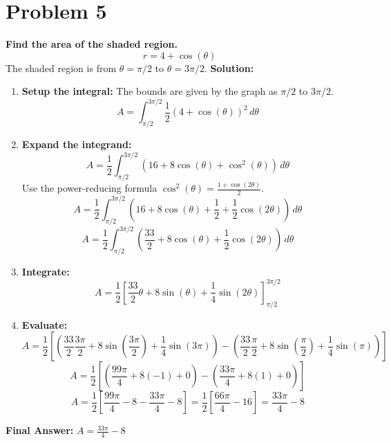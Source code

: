 \documentclass{article}
\begin{document}
\section*{Problem 5}
\textbf{Find the area of the shaded region.}
\[ r = 4 + \cos(\theta) \]
The shaded region is from $\theta = \pi/2$ to $\theta = 3\pi/2$.
\textbf{Solution:}
\begin{enumerate}
    \item \textbf{Setup the integral:} The bounds are given by the graph as $\pi/2$ to $3\pi/2$.
    \[ A = \int_{\pi/2}^{3\pi/2} \frac{1}{2} (4 + \cos(\theta))^2 \,d\theta \]
    \item \textbf{Expand the integrand:}
    \[ A = \frac{1}{2} \int_{\pi/2}^{3\pi/2} (16 + 8\cos(\theta) + \cos^2(\theta)) \,d\theta \]
    Use the power-reducing formula $\cos^2(\theta) = \frac{1 + \cos(2\theta)}{2}$.
    \[ A = \frac{1}{2} \int_{\pi/2}^{3\pi/2} \left(16 + 8\cos(\theta) + \frac{1}{2} + \frac{1}{2}\cos(2\theta)\right) \,d\theta \]
    \[ A = \frac{1}{2} \int_{\pi/2}^{3\pi/2} \left(\frac{33}{2} + 8\cos(\theta) + \frac{1}{2}\cos(2\theta)\right) \,d\theta \]
    \item \textbf{Integrate:}
    \[ A = \frac{1}{2} \left[ \frac{33}{2}\theta + 8\sin(\theta) + \frac{1}{4}\sin(2\theta) \right]_{\pi/2}^{3\pi/2} \]
    \item \textbf{Evaluate:}
    \[ A = \frac{1}{2} \left[ \left(\frac{33}{2}\frac{3\pi}{2} + 8\sin(\frac{3\pi}{2}) + \frac{1}{4}\sin(3\pi)\right) - \left(\frac{33}{2}\frac{\pi}{2} + 8\sin(\frac{\pi}{2}) + \frac{1}{4}\sin(\pi)\right) \right] \]
    \[ A = \frac{1}{2} \left[ \left(\frac{99\pi}{4} + 8(-1) + 0\right) - \left(\frac{33\pi}{4} + 8(1) + 0\right) \right] \]
    \[ A = \frac{1}{2} \left[ \frac{99\pi}{4} - 8 - \frac{33\pi}{4} - 8 \right] = \frac{1}{2} \left[ \frac{66\pi}{4} - 16 \right] = \frac{33\pi}{4} - 8 \]
\end{enumerate}
\textbf{Final Answer:} $A = \frac{33\pi}{4} - 8$
\end{document}
